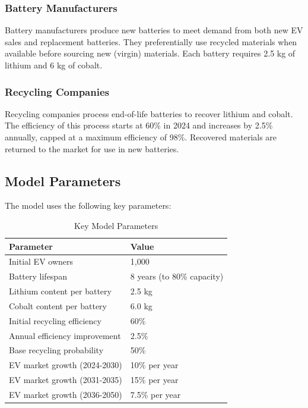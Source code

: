 \documentclass[10pt,a4paper,twocolumn]{article}
\begin{document}
\subsubsection{Battery Manufacturers}

Battery manufacturers produce new batteries to meet demand from both new EV sales and replacement batteries. They preferentially use recycled materials when available before sourcing new (virgin) materials. Each battery requires 2.5 kg of lithium and 6 kg of cobalt.

\subsubsection{Recycling Companies}

Recycling companies process end-of-life batteries to recover lithium and cobalt. The efficiency of this process starts at 60\% in 2024 and increases by 2.5\% annually, capped at a maximum efficiency of 98\%. Recovered materials are returned to the market for use in new batteries.

\subsection{Model Parameters}

The model uses the following key parameters:

\begin{table}[h]
\centering
\caption{Key Model Parameters}
\begin{tabular}{ll}
\toprule
Parameter & Value \\
\midrule
Initial EV owners & 1,000 \\
Battery lifespan & 8 years (to 80\% capacity) \\
Lithium content per battery & 2.5 kg \\
Cobalt content per battery & 6.0 kg \\
Initial recycling efficiency & 60\% \\
Annual efficiency improvement & 2.5\% \\
Base recycling probability & 50\% \\
EV market growth (2024-2030) & 10\% per year \\
EV market growth (2031-2035) & 15\% per year \\
EV market growth (2036-2050) & 7.5\% per year \\
\bottomrule
\end{tabular}
\label{tab:parameters}
\end{table}
\end{document}
